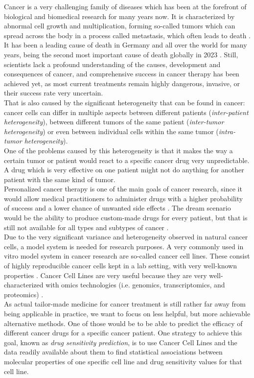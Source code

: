 Cancer is a very challenging family of diseases which has been at the forefront of biological and biomedical research for many years now. It is characterized by abnormal cell growth and multiplication, forming so-called tumors which can spread across the body in a process called metastasis, which often leads to death \citep{who-cancer}. It has been a leading cause of death in Germany and all over the world for many years, being the second most important cause of death globally in 2023 \citep{owid-causes-of-death}. Still, scientists lack a profound understanding of the causes, development and consequences of cancer, and comprehensive success in cancer therapy has been achieved yet, as most current treatments remain highly dangerous, invasive, or their success rate very uncertain.\\
That is also caused by the significant heterogeneity that can be found in cancer: cancer cells can differ in multiple aspects between different patients (\textit{inter-patient heterogeneity}), between different tumors of the same patient (\textit{inter-tumor heterogeneity}) or even between individual cells within the same tumor (\textit{intra-tumor heterogeneity}).\addref[heterogeneity]\\
One of the problems caused by this heterogeneity is that it makes the way a certain tumor or patient would react to a specific cancer drug very unpredictable. A drug which is very effective on one patient might not do anything for another patient with the same kind of tumor.\rewrite[]\\
Personalized cancer therapy is one of the main goals of cancer research, since it would allow medical practitioners to administer drugs with a higher probability of success and a lower chance of unwanted side effects \citep{meric2012overcoming}. The dream scenario would be the ability to produce custom-made drugs for every patient, but that is still not available for all types and subtypes of cancer \citep{personalized_cancer_medicine}.\\
Due to the very significant variance and heterogeneity observed in natural cancer cells, a model system is needed for research purposes. A very commonly used in vitro model system in cancer research are so-called cancer cell lines. These consist of highly reproducible cancer cells kept in a lab setting, with very well-known properties \citep{cancer_cell_line_definition}. Cancer Cell Lines are very useful because they are very well-characterized with omics technologies (i.e. genomics, transcriptomics, and proteomics) \citep{cancer_cell_lines_useful_model}.\\
As actual tailor-made medicine for cancer treatment is still rather far away from being applicable in practice, we want to focus on less helpful, but more achievable alternative methods. One of those would be to be able to predict the efficacy of different cancer drugs for a specific cancer patient. One strategy to achieve this goal, known as \textit{drug sensitivity prediction}, is to use Cancer Cell Lines and the data readily available about them to find statistical associations between molecular properties of one specific cell line and drug sensitivity values for that cell line.